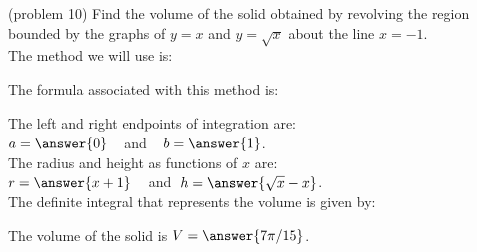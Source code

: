 \documentclass{ximera}
\begin{document}
\begin{problem}(problem 10)
Find the volume of the solid obtained by revolving the region bounded by the graphs of $y = x$ and $y = \sqrt x$ about the line $x = -1$.\\
The method we will use is:
\begin{multipleChoice}
\end{multipleChoice}

The formula associated with this method is:
\begin{multipleChoice}
\end{multipleChoice}

The left and right endpoints of integration are:\\
$a = \answer{0}\;\;\;$ and $\;\;\; b = \answer{1}$.\\
The radius and height as functions of $x$ are:\\
$r = \answer{x+1} \;\;\;$ and $\; h = \answer{\sqrt{x} - x}$.\\

The definite integral that represents the volume is given by:\\
\begin{multipleChoice}
\end{multipleChoice}

The volume of the solid is $V = \answer{7\pi/15}$.

\end{problem}
\end{document}
